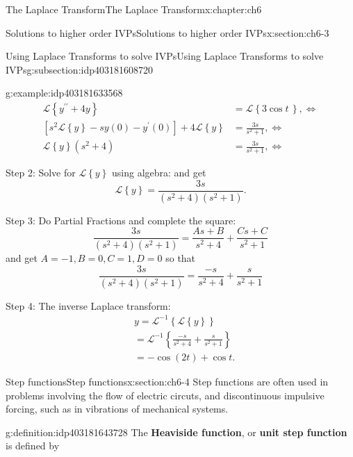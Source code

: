 \documentclass[oneside,10pt,]{book}
\newcommand{\terminology}[1]{\textbf{#1}}
\numberwithin{equation}{section}
\numberwithin{equation}{section}
\newcommand{\amp}{&}
\begin{document}
\begin{chapterptx}{The Laplace Transform}{}{The Laplace Transform}{}{}{x:chapter:ch6}
\begin{sectionptx}{Solutions to higher order IVPs}{}{Solutions to higher order IVPs}{}{}{x:section:ch6-3}
\begin{subsectionptx}{Using Laplace Transforms to solve IVPs}{}{Using Laplace Transforms to solve IVPs}{}{}{g:subsection:idp403181608720}
\begin{example}{}{g:example:idp403181633568}
\begin{align*}
\mathcal{L}\left\{ y^{\prime\prime}+4y\right\}  \amp =\mathcal{L}\left\{ 3\cos t\,\right\} ,\iff\\
\left[s^{2}\mathcal{L}\left\{ y\right\} -sy(0)-y^{\prime}(0)\right]+4\mathcal{L}\left\{ y\right\}  \amp =\frac{3s}{s^{2}+1},\iff\\
\mathcal{L}\left\{ y\right\} \left(s^{2}+4\right) \amp =\frac{3s}{s^{2}+1},\iff
\end{align*}
%
\par
Step 2: Solve for \(\mathcal{L}\left\{ y\right\} \) using algebra: and get%
\begin{equation*}
\mathcal{L}\left\{ y\right\} =\frac{3s}{\left(s^{2}+4\right)\left(s^{2}+1\right)}.
\end{equation*}
%
\par
Step 3: Do Partial Fractions and complete the square:%
\begin{equation*}
\frac{3s}{\left(s^{2}+4\right)\left(s^{2}+1\right)}=\frac{As+B}{s^{2}+4}+\frac{Cs+C}{s^{2}+1}
\end{equation*}
and get \(A=-1,B=0,C=1,D=0\) so that%
\begin{equation*}
\frac{3s}{\left(s^{2}+4\right)\left(s^{2}+1\right)}=\frac{-s}{s^{2}+4}+\frac{s}{s^{2}+1}
\end{equation*}
%
\par
Step 4: The inverse Laplace transform:%
\begin{align*}
\amp y=\mathcal{L}^{-1}\left\{ \mathcal{L}\left\{ y\right\} \right\} \\
\amp =\mathcal{L}^{-1}\left\{ \frac{-s}{s^{2}+4}+\frac{s}{s^{2}+1}\right\} \\
\amp =-\cos(2t)+\cos t.
\end{align*}
%
\end{example}
\end{subsectionptx}
\end{sectionptx}
%
%
\typeout{************************************************}
\typeout{************************************************}
%
\begin{sectionptx}{Step functions}{}{Step functions}{}{}{x:section:ch6-4}
Step functions are often used in problems involving the flow of electric circuts, and discontinuous impulsive forcing, such as in vibrations of mechanical systems.%
\begin{definition}{}{g:definition:idp403181643728}%
The \terminology{Heaviside function}, or \terminology{unit step function} is defined by%

\end{definition}
\end{sectionptx}
\end{chapterptx}
\end{document}

